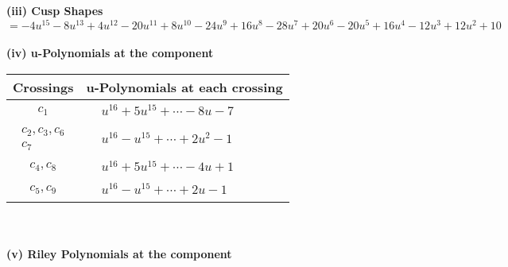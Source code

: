 \documentclass[1p]{elsarticle_modified}
\theoremstyle{definition}
\begin{document}
\flushleft \textbf{(iii) Cusp Shapes $= -4 u^{15}-8 u^{13}+4 u^{12}-20 u^{11}+8 u^{10}-24 u^9+16 u^8-28 u^7+20 u^6-20 u^5+16 u^4-12 u^3+12 u^2+10$}\\~\\
\newpage\renewcommand{\arraystretch}{1}
\flushleft \textbf{(iv) u-Polynomials at the component}\newline \\
\begin{tabular}{m{50pt}|m{274pt}}
Crossings & \hspace{64pt}u-Polynomials at each crossing \\
\hline $$\begin{aligned}c_{1}\end{aligned}$$&$\begin{aligned}
&u^{16}+5 u^{15}+\cdots-8 u-7
\end{aligned}$\\
\hline $$\begin{aligned}c_{2},c_{3},c_{6}\\c_{7}\end{aligned}$$&$\begin{aligned}
&u^{16}- u^{15}+\cdots+2 u^2-1
\end{aligned}$\\
\hline $$\begin{aligned}c_{4},c_{8}\end{aligned}$$&$\begin{aligned}
&u^{16}+5 u^{15}+\cdots-4 u+1
\end{aligned}$\\
\hline $$\begin{aligned}c_{5},c_{9}\end{aligned}$$&$\begin{aligned}
&u^{16}- u^{15}+\cdots+2 u-1
\end{aligned}$\\
\hline
\end{tabular}\\~\\
\newpage\renewcommand{\arraystretch}{1}
\flushleft \textbf{(v) Riley Polynomials at the component}\newline \\
\end{document}

